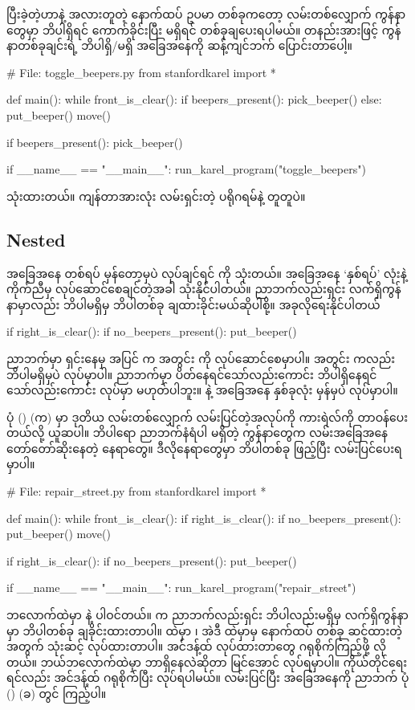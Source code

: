 ပြီးခဲ့တဲ့ဟာနဲ့ အလားတူတဲ့ နောက်ထပ် ဥပမာ တစ်ခုကတော့ လမ်းတစ်လျှောက် ကွန်နာတွေမှာ ဘိပါရှိရင် ကောက်ခိုင်းပြီး မရှိရင် တစ်ခုချပေးရပါမယ်။ တနည်းအားဖြင့် ကွန်နာတစ်ခုချင်းရဲ့ ဘိပါရှိ/မရှိ အခြေအနေကို ဆန့်ကျင်ဘက် ပြောင်းတာပေါ့။
%
\begin{py}
# File: toggle_beepers.py
from stanfordkarel import *


def main():
    while front_is_clear():
        if beepers_present():
            pick_beeper()
        else:
            put_beeper()
        move()

    if beepers_present():
        pick_beeper()


if __name__ == "__main__":
    run_karel_program("toggle_beepers")
\end{py}
%
 သုံးထားတယ်။ ကျန်တာအားလုံး လမ်းရှင်းတဲ့ ပရိုဂရမ်နဲ့ တူတူပဲ။


\subsection*{Nested }
အခြေအနေ တစ်ရပ် မှန်တော့မှပဲ လုပ်ချင်ရင်  ကို သုံးတယ်။  
အခြေအနေ ‘နှစ်ရပ်’ လုံးနဲ့ ကိုက်ညီမှ လုပ်ဆောင်စေချင်တဲ့အခါ   သုံးနိုင်ပါတယ်။ ညာဘက်လည်းရှင်း လက်ရှိကွန်နာမှာလည်း ဘိပါမရှိမှ ဘိပါတစ်ခု ချထားခိုင်းမယ်ဆိုပါစို့။ အခုလိုရေးနိုင်ပါတယ်
%
\begin{py}
if right_is_clear():
    if no_beepers_present():
        put_beeper()
\end{py}
%
ညာဘက်မှာ ရှင်းနေမှ အပြင်  က အတွင်း  ကို လုပ်ဆောင်စေမှာပါ။ အတွင်း  ကလည်း ဘိပါမရှိမှပဲ  လုပ်မှာပါ။ ညာဘက်မှာ ပိတ်နေရင်သော်လည်းကောင်း ဘိပါရှိနေရင်သော်လည်းကောင်း  လုပ်မှာ မဟုတ်ပါဘူး။  နဲ့  အခြေအနေ နှစ်ခုလုံး မှန်မှပဲ လုပ်မှာပါ။

ပုံ (\fRefNo{\ref{fig:st_repair}}) (က) မှာ ဒုတိယ လမ်းတစ်လျှောက် လမ်းပြင်တဲ့အလုပ်ကို ကားရဲလ်ကို တာဝန်ပေးတယ်လို့ ယူဆပါ။ ဘိပါရော ညာဘက်နံရံပါ မရှိတဲ့ ကွန်နာတွေက  လမ်းအခြေအနေ တော်တော်ဆိုးနေတဲ့ နေရာတွေ။ ဒီလိုနေရာတွေမှာ ဘိပါတစ်ခု ဖြည့်ပြီး လမ်းပြင်ပေးရမှာပါ။ 
%
\label{lst:repair_street}%
\begin{py}
# File: repair_street.py
from stanfordkarel import *


def main():
    while front_is_clear():
        if right_is_clear():
            if no_beepers_present():
                put_beeper()
        move()

    if right_is_clear():
        if no_beepers_present():
            put_beeper()


if __name__ == "__main__":
    run_karel_program("repair_street")
\end{py}
%
 ဘလောက်ထဲမှာ   နဲ့  ပါဝင်တယ်။   က ညာဘက်လည်းရှင်း ဘိပါလည်းမရှိမှ လက်ရှိကွန်နာမှာ ဘိပါတစ်ခု ချခိုင်းထားတာပါ။   ထဲမှာ ၊ အဲဒီ  ထဲမှာမှ နောက်ထပ်  တစ်ခု ဆင့်ထားတဲ့အတွက် သုံးဆင့်  လုပ်ထားတာပါ။ အင်ဒန့်ထ် လုပ်ထားတာတွေ ဂရုစိုက်ကြည့်ဖို့ လိုတယ်။ ဘယ်ဘလောက်ထဲမှာ ဘာရှိနေလဲဆိုတာ မြင်အောင် လုပ်ရမှာပါ။ ကိုယ်တိုင်ရေးရင်လည်း အင်ဒန့်ထ် ဂရုစိုက်ပြီး လုပ်ရပါမယ်။ လမ်းပြင်ပြီး အခြေအနေကို ညာဘက် ပုံ (\fRefNo{\ref{fig:st_repair}}) (ခ) တွင် ကြည့်ပါ။

